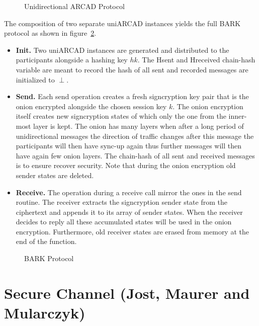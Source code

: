 \documentclass[11pt,a4paper,twoside,openright,bibliography=totoc]{scrbook}
\begin{document}
\begin{figure}[H]
  \centering
  \setlength{\fboxsep}{10pt}
  \scalebox{0.9}{%
    \fbox{%
      
    }
  }
  \caption{Unidirectional ARCAD Protocol}
  \label{fig:uni-arcad}
\end{figure}

The composition of two separate uniARCAD instances yields
the full BARK protocol as shown in figure~\ref{fig:bark}.
\begin{itemize}
\item \textbf{Init.} Two uniARCAD instances are generated and
  distributed to the participants alongside a hashing key $hk$.
  The Hsent and Hreceived chain-hash variable are meant to record
  the hash of all sent and recorded messages are initialized
  to $\perp$.
\item \textbf{Send.} Each send operation creates a fresh
  signcryption key pair that is the onion encrypted alongside
  the chosen session key $k$. The onion encryption itself
  creates new signcryption states of which only the one from
  the inner-most layer is kept. The onion has many layers when
  after a long period of unidirectional messages the direction
  of traffic changes after this message the participants will
  then have sync-up again thus further messages will then
  have again few onion layers. The chain-hash
  of all sent and received messages is to ensure recover security.
  Note that during the onion encryption old sender states are
  deleted.
\item \textbf{Receive.} The operation during a receive call
  mirror the ones in the send routine. The receiver extracts
  the signcryption sender state from the ciphertext and appends
  it to its array of sender states. When the receiver decides
  to reply all these accumulated states will be used in the
  onion encryption. Furthermore, old receiver states are
  erased from memory at the end of the function.
\end{itemize}

\begin{figure}[p]
  \centering
  \setlength{\fboxsep}{10pt}
  \scalebox{0.9}{%
    \fbox{%
      
    } 
  }
  \caption{BARK Protocol}
  \label{fig:bark}
\end{figure}

\clearpage

\section[Jost, Maurer and Mularczyk]
{Secure Channel (Jost, Maurer and Mularczyk)~\cite{jostefficient}}
\label{sec:jost-maur-mularczyk}
\end{document}

